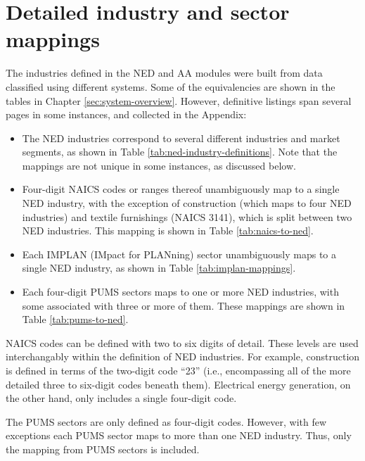 \chapter{Detailed industry and sector mappings}\label{app:industry-crosswalks}

The industries defined in the NED and AA modules were built from data classified using different systems. Some of the equivalencies are shown in the tables in Chapter \ref{sec:system-overview}. However, definitive listings span several pages in some instances, and collected in the Appendix:
\begin{itemize}
\item The NED industries correspond to several different industries and market segments, as shown in Table \ref{tab:ned-industry-definitions}. Note that the mappings are not unique in some instances, as discussed below.
\item Four-digit NAICS codes or ranges thereof unambiguously map to a single NED industry, with the exception of construction (which maps to four NED industries) and textile furnishings (NAICS 3141), which is split between two NED industries. This mapping is shown in Table \ref{tab:naics-to-ned}.
\item Each IMPLAN (IMpact for PLANning) sector unambiguously maps to a single NED industry, as shown in Table \ref{tab:implan-mappings}.
\item Each four-digit PUMS sectors maps to one or more NED industries, with some associated with three or more of them. These mappings are shown in Table \ref{tab:pums-to-ned}.
\end{itemize}

NAICS codes can be defined with two to six digits of detail. These levels are used interchangably within the definition of NED industries. For example, construction is defined in terms of the two-digit code ``23'' (i.e., encompassing all of the more detailed three to six-digit codes beneath them). Electrical energy generation, on the other hand, only includes a single four-digit code.

The PUMS sectors are only defined as four-digit codes. However, with few exceptions each PUMS sector maps to more than one NED industry. Thus, only the mapping from PUMS sectors is included. 

\newpage




